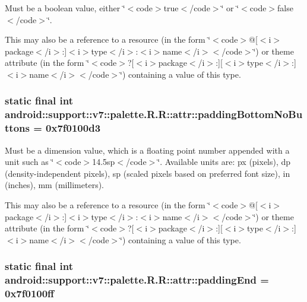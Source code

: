 Must be a boolean value, either \char`\"{}$<$code$>$true$<$/code$>$\char`\"{} or \char`\"{}$<$code$>$false$<$/code$>$\char`\"{}. 

This may also be a reference to a resource (in the form \char`\"{}$<$code$>$@\mbox{[}$<$i$>$package$<$/i$>$:\mbox{]}$<$i$>$type$<$/i$>$:$<$i$>$name$<$/i$>$$<$/code$>$\char`\"{}) or theme attribute (in the form \char`\"{}$<$code$>$?\mbox{[}$<$i$>$package$<$/i$>$:\mbox{]}\mbox{[}$<$i$>$type$<$/i$>$:\mbox{]}$<$i$>$name$<$/i$>$$<$/code$>$\char`\"{}) containing a value of this type. \hypertarget{classandroid_1_1support_1_1v7_1_1palette_1_1_r_1_1attr_1661d191bde4a1782809ab4d3f68c638}{
\subsubsection[{paddingBottomNoButtons}]{\setlength{\rightskip}{0pt plus 5cm}static final int android::support::v7::palette.R.R::attr::paddingBottomNoButtons = 0x7f0100d3}}
\label{classandroid_1_1support_1_1v7_1_1palette_1_1_r_1_1attr_1661d191bde4a1782809ab4d3f68c638}


Must be a dimension value, which is a floating point number appended with a unit such as \char`\"{}$<$code$>$14.5sp$<$/code$>$\char`\"{}. Available units are: px (pixels), dp (density-independent pixels), sp (scaled pixels based on preferred font size), in (inches), mm (millimeters). 

This may also be a reference to a resource (in the form \char`\"{}$<$code$>$@\mbox{[}$<$i$>$package$<$/i$>$:\mbox{]}$<$i$>$type$<$/i$>$:$<$i$>$name$<$/i$>$$<$/code$>$\char`\"{}) or theme attribute (in the form \char`\"{}$<$code$>$?\mbox{[}$<$i$>$package$<$/i$>$:\mbox{]}\mbox{[}$<$i$>$type$<$/i$>$:\mbox{]}$<$i$>$name$<$/i$>$$<$/code$>$\char`\"{}) containing a value of this type. \hypertarget{classandroid_1_1support_1_1v7_1_1palette_1_1_r_1_1attr_a2d804e074f548e2e57d200fa23506ba}{
\subsubsection[{paddingEnd}]{\setlength{\rightskip}{0pt plus 5cm}static final int android::support::v7::palette.R.R::attr::paddingEnd = 0x7f0100ff}}
\label{classandroid_1_1support_1_1v7_1_1palette_1_1_r_1_1attr_a2d804e074f548e2e57d200fa23506ba}


